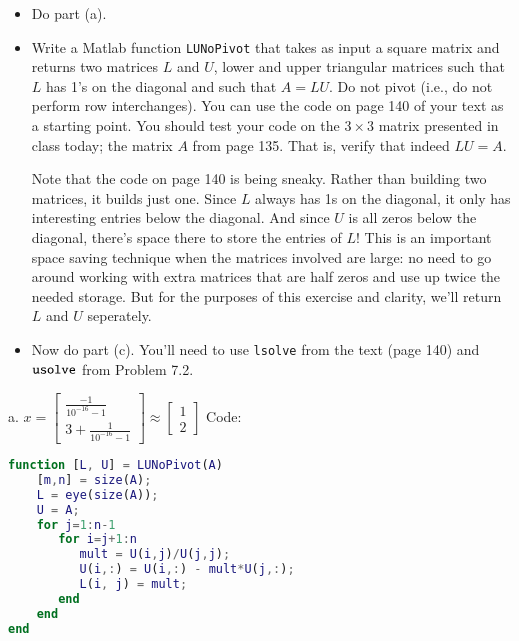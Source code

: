 \documentclass[12pt]{article}
\makeatletter
\theoremstyle{homework}
\newenvironment{exercise}[1]
{\def\@currentlabel{#1}\exercisecore}
{\endexercisecore}
\makeatother
\begin{document}
\begin{exercise} {Problem 7.3 [Modified]} \strut

\begin{itemize}
	\item Do part (a).
	\item Write a Matlab function {\tt LUNoPivot} that 
	takes as input a square matrix and returns two matrices $L$ and $U$,
	lower and upper triangular matrices such that $L$ has 1's
	on the diagonal and such that $A=LU$.  Do not pivot (i.e., do not perform row interchanges).  You can use the code on page 140
	of your text as a starting point. You should test your code on the 
	$3\times 3$ matrix presented in class today; the matrix $A$ from
	page 135.  That is, verify that indeed $LU=A$.

	Note that the code on page 140 is being sneaky.  Rather than building two matrices, it builds just one. Since $L$ always has 1s on the diagonal, it only has interesting entries below the diagonal.  And since $U$ is all zeros below the diagonal, there's space there to store the entries of $L$!  This is an important space saving technique when the matrices involved are large: no need to go around working with extra matrices that are half zeros and use up twice the needed storage.  But for the purposes of this exercise and clarity,
	we'll return $L$ and $U$ seperately.
	\item Now do part (c). You'll need to use {\tt lsolve} from the
	text (page 140) and ${\tt usolve}$ from Problem 7.2.
\end{itemize}
\end{exercise}
5.3 a.
\newline 
$x = 
\begin{bmatrix}
\frac{-1}{10^{-16}-1}\\
3 + \frac{1}{10^{-16}-1}
\end{bmatrix}
\approx
\begin{bmatrix}
1\\
2
\end{bmatrix}
$
\newline
Code:
\begin{lstlisting}[language=Matlab]
function [L, U] = LUNoPivot(A)
    [m,n] = size(A);
    L = eye(size(A));
    U = A;
    for j=1:n-1
       for i=j+1:n
          mult = U(i,j)/U(j,j);
          U(i,:) = U(i,:) - mult*U(j,:);
          L(i, j) = mult;
       end
    end
end

\end{lstlisting}
\newline
\end{document}
